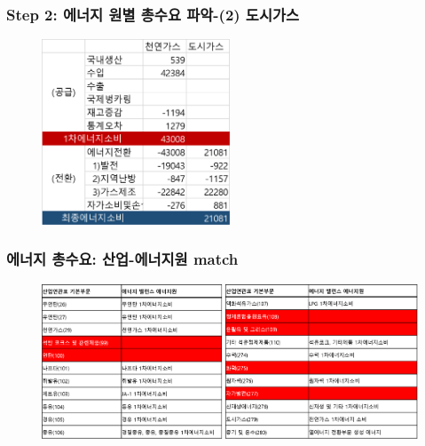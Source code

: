 \documentclass[10pt,compress,slidetop,%
			   hyperref={unicode},xcolor={svgnames},%
			   t]{beamer}
\begin{document}
\begin{frame}
	\frametitle{Step 2: 에너지 원별 총수요 파악-(2) 도시가스}
  	\begin{figure}
	\centering
	 \includegraphics[width=0.5\textwidth]{Citigas.png}
	\end{figure}	

	
\end{frame}

\begin{frame}
	\frametitle{에너지 총수요: 산업-에너지원 match}
	  	\begin{figure}
	\centering
	 \includegraphics[width=1.00\textwidth]{match.png}
	\end{figure}	
\begin{scriptsize}
\end{scriptsize} 	
\end{frame}
\end{document}
